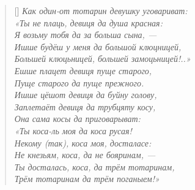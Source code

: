 \documentclass[12pt]{article}
\begin{document}
\settowidth{\versewidth}{Богатырскому серцу розгоретися,}
\begin{verse}[\versewidth]
\itshape
Как один-от тотарин девушку уговариват: \\
«Ты не плаць, девиця да душа красная:\\
Я возьму тобя да за больша сына, — \\
Ишше будёш у меня да большой клюцницей, \\
Большей клюцьницей, большей замоцьницей!..» \\
Ешше плацет девиця пуще старого, \\
Пуще старого да пуще прежного. \\
Ишше цёшот девиця да буйну голову, \\
Заплетаёт девиця да трубцяту косу, \\
Она сама косы да приговарыват: \\
«Ты коса-ль моя да коса русая! \\
Некому (так), коса моя, досталасе: \\
Не кнезьям, коса, да не бояринам, — \\
Ты досталась, коса, да трём тотаринам, \\
Трём тотаринам да трём поганыем!»
\end{verse}
\end{document}
